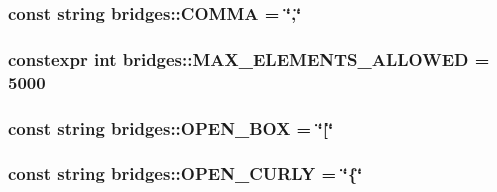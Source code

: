 \subsubsection[{C\+O\+M\+M\+A}]{\setlength{\rightskip}{0pt plus 5cm}const string bridges\+::\+C\+O\+M\+M\+A = \char`\"{},\char`\"{}}\label{namespacebridges_a74087afbaa635d3c3d837cc3b44c0162}
\hypertarget{namespacebridges_adc32aeee3ab880d297758a6d6200188f}{}
\subsubsection[{M\+A\+X\+\_\+\+E\+L\+E\+M\+E\+N\+T\+S\+\_\+\+A\+L\+L\+O\+W\+E\+D}]{\setlength{\rightskip}{0pt plus 5cm}constexpr int bridges\+::\+M\+A\+X\+\_\+\+E\+L\+E\+M\+E\+N\+T\+S\+\_\+\+A\+L\+L\+O\+W\+E\+D = 5000}\label{namespacebridges_adc32aeee3ab880d297758a6d6200188f}
\hypertarget{namespacebridges_a6b481335016325fe202a4e2fedd0af14}{}
\subsubsection[{O\+P\+E\+N\+\_\+\+B\+O\+X}]{\setlength{\rightskip}{0pt plus 5cm}const string bridges\+::\+O\+P\+E\+N\+\_\+\+B\+O\+X = \char`\"{}\mbox{[}\char`\"{}}\label{namespacebridges_a6b481335016325fe202a4e2fedd0af14}
\hypertarget{namespacebridges_a9bef552535e3f5bbfc2ca586cb5044c6}{}
\subsubsection[{O\+P\+E\+N\+\_\+\+C\+U\+R\+L\+Y}]{\setlength{\rightskip}{0pt plus 5cm}const string bridges\+::\+O\+P\+E\+N\+\_\+\+C\+U\+R\+L\+Y = \char`\"{}\{\char`\"{}}\label{namespacebridges_a9bef552535e3f5bbfc2ca586cb5044c6}
\hypertarget{namespacebridges_ad909fb43b05ef6b7271fddbe85e2742a}{}
